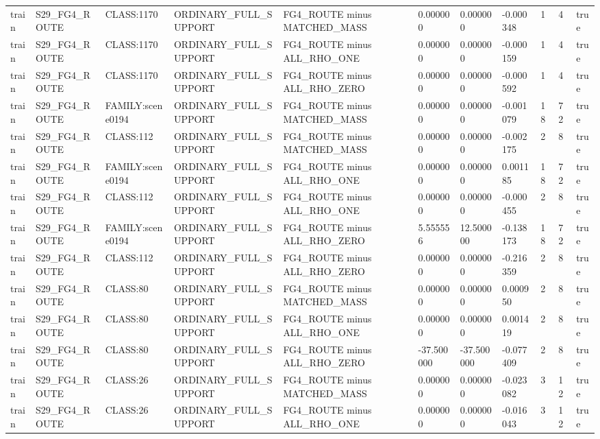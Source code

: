 \begin{tabular}{lllllllllll}
train & S29\_FG4\_ROUTE & CLASS:1170 & ORDINARY\_FULL\_SUPPORT & FG4\_ROUTE minus MATCHED\_MASS & 0.000000 & 0.000000 & -0.000348 & 1 & 4 & true \\
train & S29\_FG4\_ROUTE & CLASS:1170 & ORDINARY\_FULL\_SUPPORT & FG4\_ROUTE minus ALL\_RHO\_ONE & 0.000000 & 0.000000 & -0.000159 & 1 & 4 & true \\
train & S29\_FG4\_ROUTE & CLASS:1170 & ORDINARY\_FULL\_SUPPORT & FG4\_ROUTE minus ALL\_RHO\_ZERO & 0.000000 & 0.000000 & -0.000592 & 1 & 4 & true \\
train & S29\_FG4\_ROUTE & FAMILY:scene0194 & ORDINARY\_FULL\_SUPPORT & FG4\_ROUTE minus MATCHED\_MASS & 0.000000 & 0.000000 & -0.001079 & 18 & 72 & true \\
train & S29\_FG4\_ROUTE & CLASS:112 & ORDINARY\_FULL\_SUPPORT & FG4\_ROUTE minus MATCHED\_MASS & 0.000000 & 0.000000 & -0.002175 & 2 & 8 & true \\
train & S29\_FG4\_ROUTE & FAMILY:scene0194 & ORDINARY\_FULL\_SUPPORT & FG4\_ROUTE minus ALL\_RHO\_ONE & 0.000000 & 0.000000 & 0.001185 & 18 & 72 & true \\
train & S29\_FG4\_ROUTE & CLASS:112 & ORDINARY\_FULL\_SUPPORT & FG4\_ROUTE minus ALL\_RHO\_ONE & 0.000000 & 0.000000 & -0.000455 & 2 & 8 & true \\
train & S29\_FG4\_ROUTE & FAMILY:scene0194 & ORDINARY\_FULL\_SUPPORT & FG4\_ROUTE minus ALL\_RHO\_ZERO & 5.555556 & 12.500000 & -0.138173 & 18 & 72 & true \\
train & S29\_FG4\_ROUTE & CLASS:112 & ORDINARY\_FULL\_SUPPORT & FG4\_ROUTE minus ALL\_RHO\_ZERO & 0.000000 & 0.000000 & -0.216359 & 2 & 8 & true \\
train & S29\_FG4\_ROUTE & CLASS:80 & ORDINARY\_FULL\_SUPPORT & FG4\_ROUTE minus MATCHED\_MASS & 0.000000 & 0.000000 & 0.000950 & 2 & 8 & true \\
train & S29\_FG4\_ROUTE & CLASS:80 & ORDINARY\_FULL\_SUPPORT & FG4\_ROUTE minus ALL\_RHO\_ONE & 0.000000 & 0.000000 & 0.001419 & 2 & 8 & true \\
train & S29\_FG4\_ROUTE & CLASS:80 & ORDINARY\_FULL\_SUPPORT & FG4\_ROUTE minus ALL\_RHO\_ZERO & -37.500000 & -37.500000 & -0.077409 & 2 & 8 & true \\
train & S29\_FG4\_ROUTE & CLASS:26 & ORDINARY\_FULL\_SUPPORT & FG4\_ROUTE minus MATCHED\_MASS & 0.000000 & 0.000000 & -0.023082 & 3 & 12 & true \\
train & S29\_FG4\_ROUTE & CLASS:26 & ORDINARY\_FULL\_SUPPORT & FG4\_ROUTE minus ALL\_RHO\_ONE & 0.000000 & 0.000000 & -0.016043 & 3 & 12 & true \\

\end{tabular}
